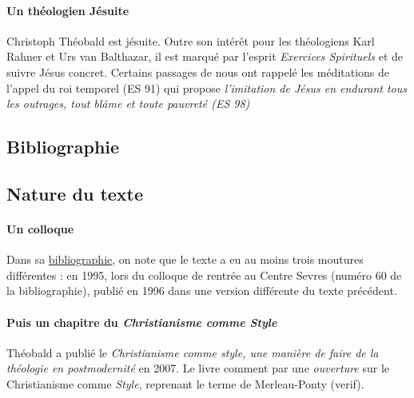 \paragraph{Un théologien Jésuite} Christoph Théobald est jésuite. Outre son intérêt pour les théologiens Karl Rahner et Urs van Balthazar, il est marqué par l'esprit \textit{Exercices Spirituels} et de suivre Jésus concret. Certains passages de \cite{theobald_christianisme_2007} nous ont rappelé les méditations de l'appel du roi temporel (ES 91)  qui propose \textit{l'imitation de Jésus en endurant tous les outrages, tout blâme et toute pauvreté (ES 98)}



\subsection{Bibliographie}





\subsection{Nature du texte}


\paragraph{Un colloque} Dans sa \href{https://centresevres.com/content/uploads/2017/07/bibliographie-complete-de-christoph-theobald-sj-2021.pdf}{bibliographie}, on note que le texte a eu au moins trois moutures différentes : en 1995, lors du colloque de rentrée au Centre Sevres (numéro 60 de la bibliographie), publié en 1996 \cite{centre_sevres_paris_unique_1996} dans  une version différente du texte précédent.  

\paragraph{Puis un chapitre du \textit{Christianisme comme Style}} Théobald a publié le \textit{Christianisme comme style, une manière de faire de la théologie en postmodernité}\cite{theobald_christianisme_2007} en 2007. Le livre comment par une \textit{ouverture} sur le Christianisme comme \textit{Style}, reprenant le terme de Merleau-Ponty (verif). 

